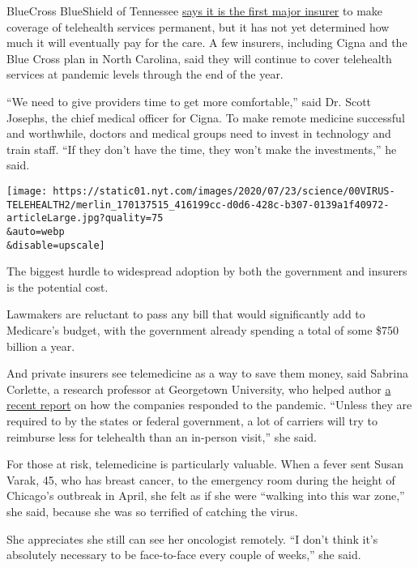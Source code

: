 BlueCross BlueShield of Tennessee
\href{https://bcbstnews.com/pressreleases/bluecross-making-in-network-telehealth-services-permanent/}{says
it is the first major insurer} to make coverage of telehealth services
permanent, but it has not yet determined how much it will eventually pay
for the care. A few insurers, including Cigna and the Blue Cross plan in
North Carolina, said they will continue to cover telehealth services at
pandemic levels through the end of the year.

``We need to give providers time to get more comfortable,'' said Dr.
Scott Josephs, the chief medical officer for Cigna. To make remote
medicine successful and worthwhile, doctors and medical groups need to
invest in technology and train staff. ``If they don't have the time,
they won't make the investments,'' he said.

\texttt{[image: https://static01.nyt.com/images/2020/07/23/science/00VIRUS-TELEHEALTH2/merlin\_170137515\_416199cc-d0d6-428c-b307-0139a1f40972-articleLarge.jpg?quality=75\\\&auto=webp\\\&disable=upscale]}

The biggest hurdle to widespread adoption by both the government and
insurers is the potential cost.

Lawmakers are reluctant to pass any bill that would significantly add to
Medicare's budget, with the government already spending a total of some
\$750 billion a year.

And private insurers see telemedicine as a way to save them money, said
Sabrina Corlette, a research professor at Georgetown University, who
helped author
\href{https://www.rwjf.org/en/library/research/2020/06/the-covid-19-pandemic-insurer-insights-into-challenges-implications-and-lessons-learned.html?cid=xem_other_unpd_ini:moni_dte:20200629_des:insurer\%20insight}{a
recent report} on how the companies responded to the pandemic. ``Unless
they are required to by the states or federal government, a lot of
carriers will try to reimburse less for telehealth than an in-person
visit,'' she said.

For those at risk, telemedicine is particularly valuable. When a fever
sent Susan Varak, 45, who has breast cancer, to the emergency room
during the height of Chicago's outbreak in April, she felt as if she
were ``walking into this war zone,'' she said, because she was so
terrified of catching the virus.

She appreciates she still can see her oncologist remotely. ``I don't
think it's absolutely necessary to be face-to-face every couple of
weeks,'' she said.

